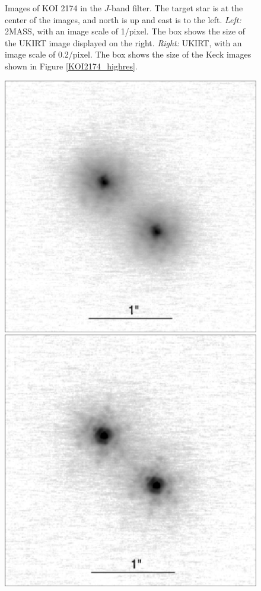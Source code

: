 \documentclass[twocolumn,appendixfloats]{aastex6}
\begin{document}
\begin{figure}[!t]
\caption{Images of KOI 2174 in the $J$-band filter. The target star is at the center
of the images, and north is up and east is to the left. {\it Left:} 2MASS, with 
an image scale of 1\arcsec/pixel. The box shows the size of the UKIRT image 
displayed on the right. {\it Right:} UKIRT, with an image scale of 0.2\arcsec/pixel. 
The box shows the size of the Keck images shown in Figure \ref{KOI2174_highres}.
\label{KOI2174_lowres}}
\end{figure}

\begin{figure}[!t]
\centering
\includegraphics[scale=0.4]{KOI2174_Keck_J.pdf}
\includegraphics[scale=0.4]{KOI2174_Keck_K.pdf}

\end{figure}
\end{document}
